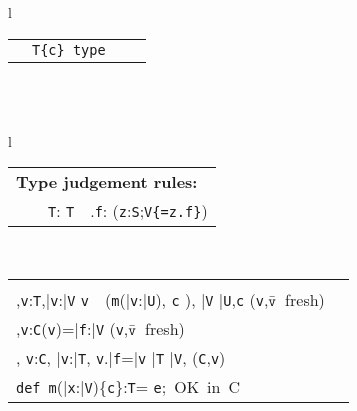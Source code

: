 \begin{figure*}
\begin{tabular}{l}
{\begin{tabular}{p{}p{}p{}p{}}
&
\infrule[Dep]
	{\tt \Gamma \vdash T\ \type \andalso \Gamma, \self:T \vdash c:o}
	{\tt \Gamma \vdash T\{c\}\ {\tt type}} 
\end{tabular}}
\quad\\
\quad\\
{\tabcolsep=0pt
\begin{tabular}{l}
\begin{tabular}{p{}p{}p{}}
\multicolumn{3}{l}{\bf Type judgement rules:}\\
\infax[T-Var]
      {\Gamma, {\tt x}:{\tt T} \vdash {\tt x}:{\tt T\{\self==x\}}}
&
\infrule[T-Cast]
	{\Gamma \vdash {\tt e}:{\tt U} \andalso \Gamma \vdash {\tt T} \ \type}
	{\Gamma \vdash {\tt e}\ \as\ {\tt T}: {\tt T}} &
\infrule[T-Field]
	{\Gamma \vdash {\tt e}: {\tt S} \andalso \Gamma,{\tt z}:{\tt S}\vdash {\tt z}\ \has\ {\tt f}:{\tt V} \andalso \mbox{({\tt z} fresh)} }
	{\Gamma \vdash {\tt e}.{\tt f}:  ({\tt z}:{\tt S};{\tt V\{\self=z.f\}})}
\end{tabular}\\
\begin{tabular}{p{}p{}} 
\infrule[T-INVK]
	{\Gamma \vdash {\tt e}:{\tt T},\bar{\tt e}:\bar{\tt V} \andalso \\
	  \Gamma,{\tt v}:{\tt T},\bar{\tt v}:\bar{\tt V} \vdash
		{\tt v}\ \has\ ({\tt m}(\bar{\tt v}:\bar{\tt U}), {\tt c} \rightarrow {\tt S}), 
		\bar{\tt V} \subtype \bar{\tt U},{\tt c} 
	  \andalso \mbox{({\tt v},$\bar{\tt v}$ fresh)}}
	{\Gamma \vdash {\tt e}.{\tt m}(\bar{\tt e}): ({\tt v}:{\tt T};\bar{\tt v}:\bar{\tt V};S)}
	&
\infrule[T-NEW]
	{\Gamma \vdash \bar{\tt e}:\bar{\tt T} \andalso \vdash \klass({\tt C}) \\ 
	  \Gamma,{\tt v}:{\tt C}\vdash \fields({\tt v})=\bar{\tt f}:\bar{\tt V}  \andalso \mbox{({\tt v},$\bar{\tt v}$\ fresh)}\\
	  \Gamma, {\tt v}:{\tt C}, \bar{\tt v}:\bar{\tt T}, {\tt v}.\bar{\tt f}=\bar{\tt v} 
	  \vdash \bar{\tt T} \subtype \bar{\tt V}, \inv({\tt C},{\tt v})}
	{\Gamma \vdash \new\ {\tt C}(\bar{\tt e}): {\tt C}\{\bar{\tt v}:\bar{\tt T}; \new\ {\tt C}(\bar{\tt v})=\self, \inv({\tt C},\self)\}}\\
\infrule[Method OK]
	{\this:{\tt C}\vdash {\tt c}:o \andalso \this:{\tt C},\bar{\tt x}:\bar{\tt V},{\tt c} \vdash {\tt T} \ \type, \bar{\tt V} \ \type, 
	  {\tt e}:{\tt S}, {\tt S} \subtype {\tt T}}
	{{\tt def}\ {\tt m}(\bar{\tt x}:\bar{\tt V})\{{\tt c}\}:{\tt T}= {\tt e};\ \mbox{OK in}\ C}
	&
\infrule[Class OK]
	{\bar{\tt M}\ \mbox{OK in}\ {\tt C}\andalso \this:{\tt C}\vdash {\tt c}:o \andalso \this:{\tt C},{\tt c} \vdash \bar{\tt V}\ \type, {\tt N}\ \type}

\end{tabular}
\end{tabular}}
\end{tabular}
\end{figure*}
